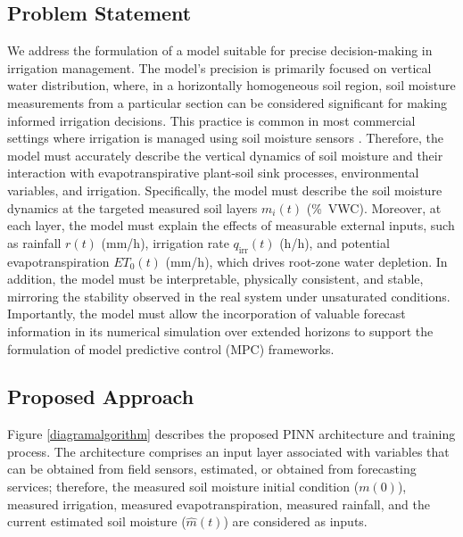 \documentclass[pdflatex,sn-nature]{sn-jnl}%
\theoremstyle{thmstyleone}%
\theoremstyle{thmstyletwo}%
\theoremstyle{thmstylethree}%
\begin{document}
\subsection{Problem Statement}
We address the formulation of a model suitable for precise decision-making in irrigation management. The model's precision is primarily focused on vertical water distribution, where, in a horizontally homogeneous soil region, soil moisture measurements from a particular section can be considered significant for making informed irrigation decisions. This practice is common in most commercial settings where irrigation is managed using soil moisture sensors \cite{Rossini2021, Mandal2025}.
Therefore, the model must accurately describe the vertical dynamics of soil moisture and their interaction with evapotranspirative plant-soil sink processes, environmental variables, and irrigation. Specifically, the model must describe the soil moisture dynamics at the targeted measured soil layers $m_i(t)$ (\si{\%VWC}). 
Moreover, at each layer, the model must explain the effects of measurable external inputs, such as rainfall $r(t)$ (\si{mm/h}), irrigation rate $q_{\mathrm{irr}}(t)$ (\si{h/h}), and potential evapotranspiration $ET_0(t)$ (\si{mm/h}), which drives root-zone water depletion.
In addition, the model must be interpretable, physically consistent, and stable, mirroring the stability observed in the real system under unsaturated conditions.
Importantly, the model must allow the incorporation of valuable forecast information in its numerical simulation over extended horizons to support the formulation of model predictive control (MPC) frameworks.


\subsection{Proposed Approach}

Figure \ref{diagramalgorithm} describes the proposed PINN architecture and training process. The architecture comprises an input layer associated with variables that can be obtained from field sensors, estimated, or obtained from forecasting services; therefore, the measured soil moisture initial condition ($m(0)$), measured irrigation, measured evapotranspiration, measured rainfall, and the current estimated soil moisture ($\hat{m}(t)$) are considered as inputs.
\end{document}
